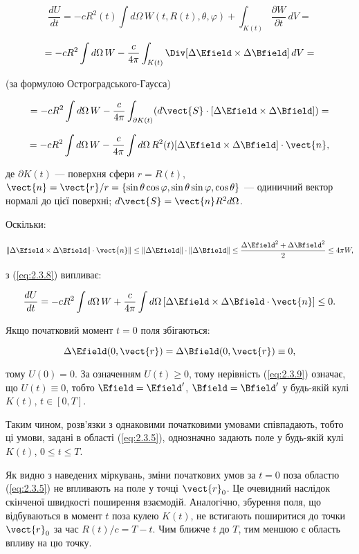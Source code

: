 \[
\frac{dU}{dt} = -c R^2(t) \int d\Omega \, W(t, R(t), \theta, \varphi) + \int_{K(t)} \frac{\partial W}{\partial t} \, dV =
\]

\[
= -c R^2 \int d\Omega \, W - \frac{c}{4\pi} \int_{K(t)} \Div [\Delta \Efield \times \Delta \Bfield] \, dV =
\]

(за формулою Остроградського-Гаусса)

\[
= -c R^2 \int d\Omega \, W - \frac{c}{4\pi} \int_{\partial K(t)} (d\vect{S} \cdot [\Delta \Efield \times \Delta \Bfield]) =
\]

\[
= -c R^2 \int d\Omega \, W - \frac{c}{4\pi} \int d\Omega \, R^2(t) [\Delta \Efield \times \Delta \Bfield] \cdot \vect{n}, \label{eq:2.3.8}
\]

де \( \partial K(t) \) --- поверхня сфери \( r = R(t) \), \( \vect{n} = \vect{r} / r = \{\sin \theta \cos \varphi, \sin \theta \sin \varphi, \cos
\theta\} \) --- одиничний вектор нормалі до цієї поверхні; \( d\vect{S} = \vect{n} R^2 d\Omega \).

Оскільки:

\[
\| \Delta \Efield \times \Delta \Bfield \| \cdot \vect{n} \| \leq \| \Delta \Efield \| \cdot \| \Delta \Bfield \| \leq \frac{\Delta \Efield^2 +
\Delta \Bfield^2}{2} \leq 4\pi W,
\]

з (\ref{eq:2.3.8}) випливає:

\[
\frac{dU}{dt} = -c R^2 \int d\Omega \, W + \frac{c}{4\pi} \int d\Omega \, [\Delta \Efield \times \Delta \Bfield \cdot \vect{n}] \leq 0.
\label{eq:2.3.9}
\]

Якщо початковий момент \( t = 0 \) поля збігаються:

\[
\Delta \Efield(0, \vect{r}) = \Delta \Bfield(0, \vect{r}) \equiv 0,
\]

тому \( U(0) = 0 \). За означенням \( U(t) \geq 0 \), тому нерівність (\ref{eq:2.3.9}) означає, що \( U(t) \equiv 0 \), тобто \( \Efield = \Efield'
\), \( \Bfield = \Bfield' \) у будь-якій кулі \( K(t) \), \( t \in [0, T] \).

Таким чином, розв’язки з однаковими початковими умовами співпадають, тобто ці умови, задані в області (\ref{eq:2.3.5}), однозначно задають поле у
будь-якій кулі \( K(t) \), \( 0 \leq t \leq T \).

Як видно з наведених міркувань, зміни початкових умов за \( t = 0 \) поза областю (\ref{eq:2.3.5}) не впливають на поле у точці \( \vect{r}_0 \). Це
очевидний наслідок скінченої швидкості поширення взаємодій. Аналогічно, збурення поля, що відбуваються в момент \( t \) поза кулею \( K(t) \), не
встигають поширитися до точки \( \vect{r}_0 \) за час \( R(t)/c = T - t \). Чим ближче \( t \) до \( T \), тим меншою є область впливу на цю точку.

